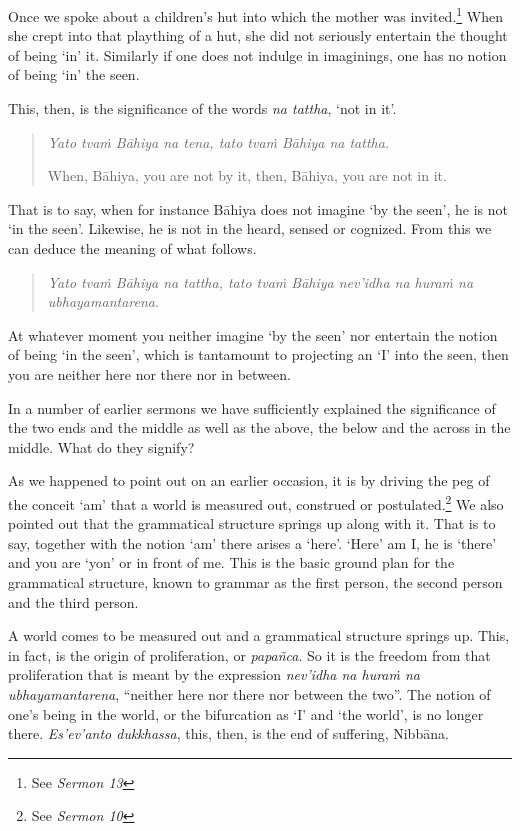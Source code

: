 Once we spoke about a children's hut into which the mother was invited.\footnote{See \emph{Sermon 13}} When she crept into that plaything of a hut, she did not seriously entertain the thought of being `in' it. Similarly if one does not indulge in imaginings, one has no notion of being `in' the seen.

This, then, is the significance of the words \emph{na tattha}, `not in it'.

\begin{quote}
\emph{Yato tvaṁ Bāhiya na tena, tato tvaṁ Bāhiya na tattha.}

When, Bāhiya, you are not by it, then, Bāhiya, you are not in it.
\end{quote}

That is to say, when for instance Bāhiya does not imagine `by the seen', he is not `in the seen'. Likewise, he is not in the heard, sensed or cognized. From this we can deduce the meaning of what follows.

\begin{quote}
\emph{Yato tvaṁ Bāhiya na tattha, tato tvaṁ Bāhiya nev'idha na huraṁ na ubhayamantarena}.
\end{quote}

At whatever moment you neither imagine `by the seen' nor entertain the notion of being `in the seen', which is tantamount to projecting an `I' into the seen, then you are neither here nor there nor in between.

In a number of earlier sermons we have sufficiently explained the significance of the two ends and the middle as well as the above, the below and the across in the middle. What do they signify?

As we happened to point out on an earlier occasion, it is by driving the peg of the conceit `am' that a world is measured out, construed or postulated.\footnote{See \emph{Sermon 10}} We also pointed out that the grammatical structure springs up along with it. That is to say, together with the notion `am' there arises a `here'. `Here' am I, he is `there' and you are `yon' or in front of me. This is the basic ground plan for the grammatical structure, known to grammar as the first person, the second person and the third person.

A world comes to be measured out and a grammatical structure springs up. This, in fact, is the origin of proliferation, or \emph{papañca}. So it is the freedom from that proliferation that is meant by the expression \emph{nev'idha na huraṁ na ubhayamantarena}, ``neither here nor there nor between the two''. The notion of one's being in the world, or the bifurcation as `I' and `the world', is no longer there. \emph{Es'ev'anto dukkhassa}, this, then, is the end of suffering, Nibbāna.

